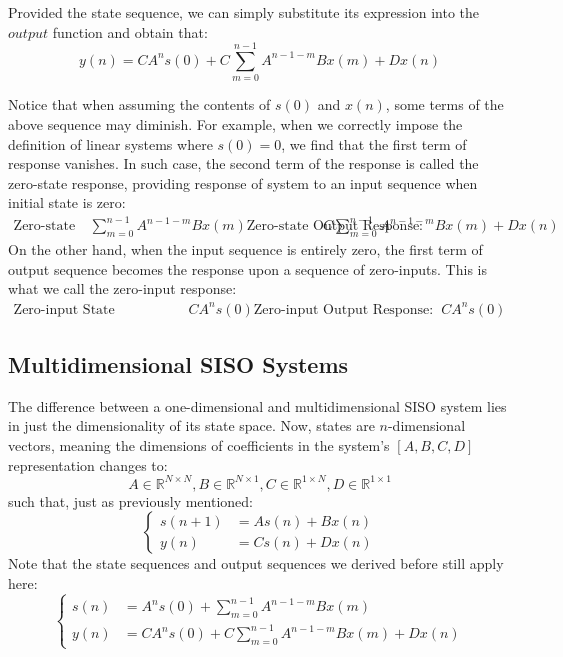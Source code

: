 Provided the state sequence, we can simply substitute its expression into the $output$ function and obtain that:
\[
    y(n) = C A^n s(0) + C \sum_{m = 0}^{n - 1} A^{n - 1 - m} B x(m) + D x(n)
\]

Notice that when assuming the contents of $s(0)$ and $x(n)$, some terms of the above sequence may diminish.
For example, when we correctly impose the definition of linear systems where $s(0) = 0$, we find that the first term of response vanishes. In such case, the second term of the response is called the zero-state response, providing response of system to an input sequence when initial state is zero:
\begin{align*}
    \text{Zero-state State Response: } &\sum_{m = 0}^{n - 1} A^{n - 1 - m} B x(m)
    \text{Zero-state Output Response: } &C \sum_{m = 0}^{n - 1} A^{n - 1 - m} B x(m) + D x(n)
\end{align*}
On the other hand, when the input sequence is entirely zero, the first term of output sequence becomes the response upon a sequence of zero-inputs. This is what we call the zero-input response:
\begin{align*}
    \text{Zero-input State Response: } &C A^n s(0)
    \text{Zero-input Output Response: } &C A^n s(0)
\end{align*}

\subsection{Multidimensional SISO Systems}
The difference between a one-dimensional and multidimensional SISO system lies in just the dimensionality of its state space.
Now, states are $n$-dimensional vectors, meaning the dimensions of coefficients in the system's $[A, B, C, D]$ representation changes to:
\[
    A \in \mathbb{R}^{N \times N}, B \in \mathbb{R}^{N \times 1},
    C \in \mathbb{R}^{1 \times N}, D \in \mathbb{R}^{1 \times 1}
\]
such that, just as previously mentioned:
\[
    \begin{cases}
        s(n + 1) &= A s(n) + B x(n) \\
        y(n) &= C s(n) + D x(n)
    \end{cases}
\]
Note that the state sequences and output sequences we derived before still apply here:
\[
    \begin{cases}
        s(n) &= A^n s(0) + \sum_{m = 0}^{n - 1} A^{n - 1 - m} B x(m) \\
        y(n) &= C A^n s(0) + C \sum_{m = 0}^{n - 1} A^{n - 1 - m} B x(m) + D x(n)
    \end{cases}
\]

